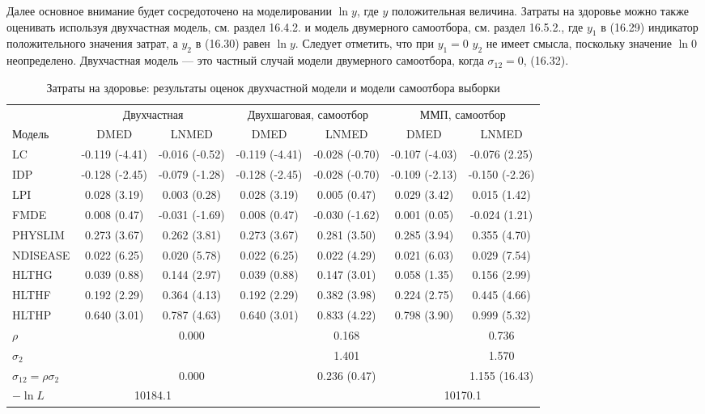 Далее основное внимание будет сосредоточено на моделировании $\ln{ y}$, где $y$ положительная величина. Затраты на здоровье можно также оценивать используя двухчастная модель, см. раздел 16.4.2. и модель двумерного самоотбора, см. раздел 16.5.2., где $y_1$ в (16.29) индикатор положительного значения затрат, а $y_2$ в (16.30) равен $\ln{ y}$. Следует отметить, что при $y_1=0$ $y_2$ не имеет смысла, поскольку значение $\ln{ 0}$ неопределено. Двухчастная модель  --- это частный случай модели двумерного самоотбора, когда $\sigma_{12}=0$, (16.32).



\begin{table}[h!]
\caption{\label{tab:16.1} Затраты на здоровье: результаты оценок двухчастной модели и модели самоотбора выборки}
\begin{center}
\begin{tabular}{lcccccc}
\hline
\hline
& \multicolumn{2}{c}{Двухчастная} & \multicolumn{2}{c}{Двухшаговая, самоотбор} & \multicolumn{2}{c}{ММП, самоотбор} \\
Модель & DMED & LNMED & DMED & LNMED & DMED & LNMED \\
\hline
LC & -0.119 (-4.41) & -0.016 (-0.52) & -0.119 (-4.41) &   -0.028 (-0.70)  & -0.107 (-4.03) & -0.076 (2.25) \\
IDP & -0.128 (-2.45) & -0.079 (-1.28) & -0.128 (-2.45) & -0.028 (-0.70) &  -0.109 (-2.13) & -0.150 (-2.26) \\
LPI & 0.028 (3.19)  &  0.003 (0.28)  &  0.028 (3.19)  & 0.005 (0.47)  & 0.029 (3.42)  & 0.015 (1.42) \\
FMDE & 0.008 (0.47)  &  -0.031 (-1.69) &   0.008 (0.47)  & -0.030 (-1.62) &  0.001 (0.05) & -0.024 (1.21) \\
PHYSLIM & 0.273 (3.67)  &  0.262 (3.81)  &  0.273 (3.67)  &  0.281 (3.50) & 0.285  (3.94) & 0.355 (4.70) \\
NDISEASE  & 0.022 (6.25)  &  0.020 (5.78)  &  0.022 (6.25)  & 0.022 (4.29) & 0.021  (6.03) & 0.029 (7.54) \\
HLTHG &  0.039 (0.88)  &  0.144 (2.97)  &  0.039 (0.88)  &  0.147 (3.01) & 0.058  (1.35) & 0.156 (2.99) \\
HLTHF & 0.192 (2.29)  &  0.364 (4.13)  &  0.192 (2.29)   &   0.382 (3.98) & 0.224  (2.75) & 0.445 (4.66) \\
HLTHP & 0.640 (3.01)  &  0.787 (4.63)  &  0.640 (3.01)   &   0.833 (4.22) & 0.798  (3.90) & 0.999 (5.32) \\
$\rho$ & & 0.000 & & 0.168 & & 0.736 \\
$\sigma_2$ & &  & & 1.401 & & 1.570 \\
$\sigma_{12}=\rho \sigma_2$ & & 0.000 & & 0.236 (0.47) & & 1.155 (16.43) \\
$-\ln L$ & \multicolumn{2}{c}{10184.1} & & & \multicolumn{2}{c}{10170.1} \\
\hline
\hline
\end{tabular}
\end{center}
\end{table}

